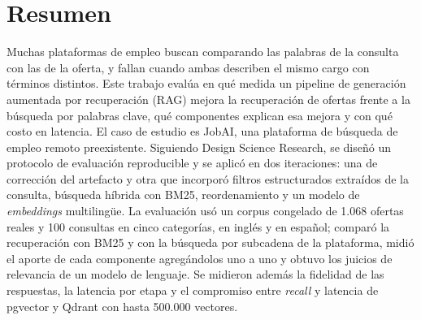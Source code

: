 \section*{Resumen}


Muchas plataformas de empleo buscan comparando las palabras de la consulta con las de la oferta, y fallan cuando ambas describen el mismo cargo con términos distintos. Este trabajo evalúa en qué medida un pipeline de generación aumentada por recuperación (RAG) mejora la recuperación de ofertas frente a la búsqueda por palabras clave, qué componentes explican esa mejora y con qué costo en latencia. El caso de estudio es JobAI, una plataforma de búsqueda de empleo remoto preexistente. Siguiendo Design Science Research, se diseñó un protocolo de evaluación reproducible y se aplicó en dos iteraciones: una de corrección del artefacto y otra que incorporó filtros estructurados extraídos de la consulta, búsqueda híbrida con BM25, reordenamiento y un modelo de \textit{embeddings} multilingüe. La evaluación usó un corpus congelado de 1.068 ofertas reales y 100 consultas en cinco categorías, en inglés y en español; comparó la recuperación con BM25 y con la búsqueda por subcadena de la plataforma, midió el aporte de cada componente agregándolos uno a uno y obtuvo los juicios de relevancia de un modelo de lenguaje. Se midieron además la fidelidad de las respuestas, la latencia por etapa y el compromiso entre \textit{recall} y latencia de pgvector y Qdrant con hasta 500.000 vectores.

